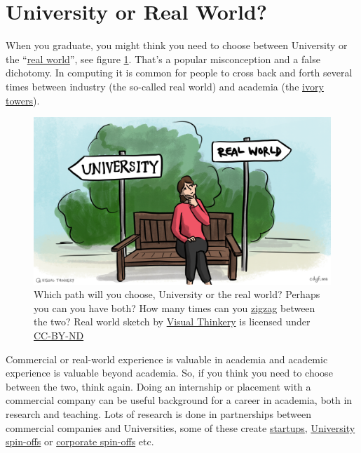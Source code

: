 \documentclass[
]{book}
\begin{document}
\hypertarget{realworld}{%
\section{University or Real World?}\label{realworld}}

When you graduate, you might think you need to choose between University or the ``\href{https://en.wikipedia.org/wiki/Real_life}{real world}'', see figure \ref{fig:realworld-fig}. That's a popular misconception and a false dichotomy. In computing it is common for people to cross back and forth several times between industry (the so-called real world) and academia (the \href{https://en.wikipedia.org/wiki/Ivory_tower}{ivory towers}).

\begin{figure}

{\centering \includegraphics[width=1\linewidth]{images/University-or-real-world} 

}

\caption{Which path will you choose, University or the real world? Perhaps you can you have both? How many times can you \href{https://en.wikipedia.org/wiki/Zigzag}{zigzag} between the two? Real world sketch by \href{https://visualthinkery.com/}{Visual Thinkery} is licensed under \href{https://creativecommons.org/licenses/by-nd/4.0/}{CC-BY-ND}}\label{fig:realworld-fig}
\end{figure}



Commercial or real-world experience is valuable in academia and academic experience is valuable beyond academia. So, if you think you need to choose between the two, think again. Doing an internship or placement with a commercial company can be useful background for a career in academia, both in research and teaching. Lots of research is done in partnerships between commercial companies and Universities, some of these create \href{https://en.wikipedia.org/wiki/Startup_company}{startups}, \href{https://en.wikipedia.org/wiki/University_spin-off}{University spin-offs} or \href{https://en.wikipedia.org/wiki/Corporate_spin-off}{corporate spin-offs} etc.
\end{document}
